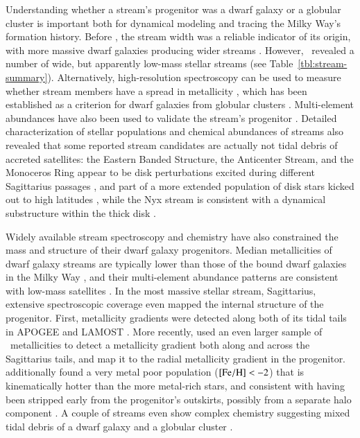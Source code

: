 \documentclass[final,5p,times,twocolumn,authoryear]{elsarticle}
\begin{document}
Understanding whether a stream's progenitor was a dwarf galaxy or a globular cluster is important both for dynamical modeling and tracing the Milky Way's formation history.
Before \gaia, the stream width was a reliable indicator of its origin, with more massive dwarf galaxies producing wider streams \citep[e.g.,][]{belokurov:2006, bonaca:2012}.
However, \gaia\ revealed a number of wide, but apparently low-mass stellar streams (see Table~\ref{tbl:stream-summary}).
Alternatively, high-resolution spectroscopy can be used to measure whether stream members have a spread in metallicity \citep[e.g.,][]{ji:2020,chandra:2022}, which has been established as a criterion for  dwarf galaxies from globular clusters \citep{willman:2012}.
Multi-element abundances have also been used to validate the stream's progenitor \citep[e.g., NGC~3201 as the progenitor of the Gj\" ol stream,][]{hansen:2020}.
Detailed characterization of stellar populations and chemical abundances of streams also revealed that some reported stream candidates are actually not tidal debris of accreted satellites: the Eastern Banded Structure, the Anticenter Stream, and the Monoceros Ring appear to be disk perturbations excited during different Sagittarius passages \citep[cf.][]{deason:2018, laporte:2020}, and part of a more extended population of disk stars kicked out to high latitudes \citep{price-whelan:2015,bergemann:2018,laporte:2018}, while the Nyx stream is consistent with a dynamical substructure within the thick disk \citep[cf.][]{zucker:2021,wang:2023}.

Widely available stream spectroscopy and chemistry have also constrained the mass and structure of their dwarf galaxy progenitors.
Median metallicities of dwarf galaxy streams are typically lower than those of the bound dwarf galaxies in the Milky Way \citep{li:2022}, and their multi-element abundance patterns are consistent with low-mass satellites \citep[$\approx10^6\,\unit{\msun}$,][]{ji:2020,hawkins:2023}.
In the most massive stellar stream, Sagittarius, extensive spectroscopic coverage even mapped the internal structure of the progenitor.
First, metallicity gradients were detected along both of its tidal tails in APOGEE \citep{hayes:2020} and LAMOST \citep{zhao:2020}.
More recently, \citet{cunningham:2024} used an even larger sample of \gaia\ metallicities \citep{andrae:2023} to detect a metallicity gradient both along and across the Sagittarius tails, and map it to the radial metallicity gradient in the progenitor.
\citet{johnson:2020} additionally found a very metal poor population (${[\mathrm{Fe}/\mathrm{H}]}<-2$) that is kinematically hotter than the more metal-rich stars, and consistent with having been stripped early from the progenitor's outskirts, possibly from a separate halo component \citep[see also][]{limberg:2023}.
A couple of streams even show complex chemistry suggesting mixed tidal debris of a dwarf galaxy and a globular cluster \citep{hansen:2021,limberg:2024}.
\end{document}
